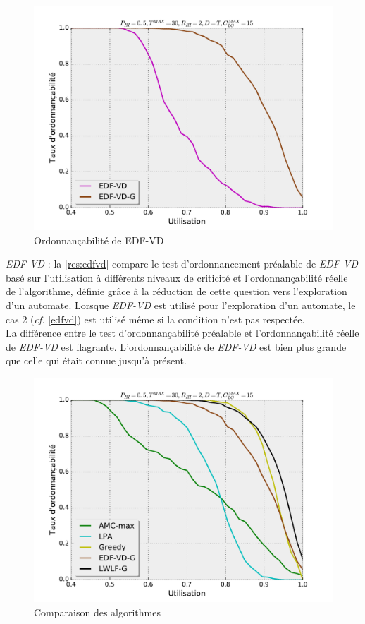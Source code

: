 \documentclass[12pt,a4paper,oneside]{book}
\theoremstyle{break}
\theoremstyle{breakplain}
\begin{document}
\pagebreak

\begin{figure}[h]
\includegraphics[width=\textwidth]{./results/perfEDFVD.pdf}
\caption{Ordonnançabilité de EDF-VD}
\label{res:edfvd}
\end{figure}

\textit{EDF-VD} : la \autoref{res:edfvd} compare le test d'ordonnancement préalable de \textit{EDF-VD} basé sur l'utilisation à différents niveaux de criticité et l'ordonnançabilité réelle de l'algorithme, définie grâce à la réduction de cette question vers l'exploration d'un automate. Lorsque \textit{EDF-VD} est utilisé pour l'exploration d'un automate, le cas 2 (\textit{cf.} \autoref{edfvd}) est utilisé même si la condition n'est pas respectée.\\

La différence entre le test d'ordonnançabilité préalable et l'ordonnançabilité réelle de \textit{EDF-VD} est flagrante. L'ordonnançabilité de \textit{EDF-VD} est bien plus grande que celle qui était connue jusqu'à présent.\\

\pagebreak

\begin{figure}[h]
\includegraphics[width=\textwidth]{./results/perfComp.pdf}
\caption{Comparaison des algorithmes}
\label{res:full}
\end{figure}
\end{document}
